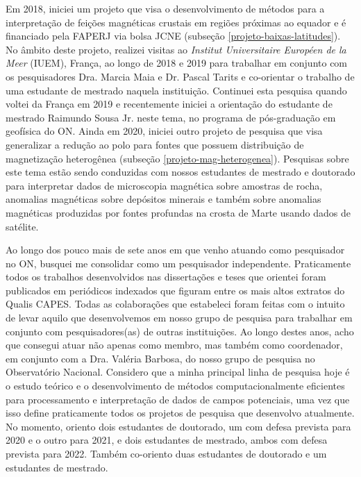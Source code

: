 Em 2018, iniciei um projeto que visa o desenvolvimento de métodos para a interpretação 
de feições magnéticas crustais em regiões próximas ao equador e é financiado pela 
FAPERJ via bolsa JCNE (subseção \ref{projeto-baixas-latitudes}). 
No âmbito deste projeto, realizei visitas ao \textit{Institut Universitaire Européen 
de la Meer} (IUEM), França, ao longo de 2018 e 2019 para trabalhar em conjunto com 
os pesquisadores Dra. Marcia Maia e Dr. Pascal Tarits e co-orientar o trabalho de 
uma estudante de mestrado naquela instituição. 
Continuei esta pesquisa quando voltei da França em 2019 e recentemente iniciei 
a orientação do estudante de mestrado Raimundo Sousa Jr. neste tema, no programa
de pós-graduação em geofísica do ON.
Ainda em 2020, iniciei outro projeto de pesquisa que visa generalizar a redução ao 
polo para fontes que possuem distribuição de magnetização heterogênea (subseção 
\ref{projeto-mag-heterogenea}). Pesquisas sobre este tema estão sendo conduzidas 
com nossos estudantes de mestrado e doutorado para interpretar dados de microscopia 
magnética sobre amostras de rocha, anomalias magnéticas sobre depósitos minerais e 
também sobre anomalias magnéticas produzidas por fontes profundas na crosta de Marte
usando dados de satélite.

Ao longo dos pouco mais de sete anos em que venho atuando como pesquisador no ON, 
busquei me consolidar como um pesquisador independente. 
Praticamente todos os trabalhos desenvolvidos nas dissertações e teses que 
orientei foram publicados em periódicos indexados que figuram entre 
os mais altos extratos do Qualis CAPES.
Todas as colaborações que estabeleci foram feitas com o intuito de levar aquilo que 
desenvolvemos em nosso grupo de pesquisa para trabalhar em conjunto com 
pesquisadores(as) de outras instituições. 
Ao longo destes anos, acho que consegui atuar não apenas como membro, mas também 
como coordenador, em conjunto com a Dra. Valéria Barbosa, do nosso grupo de pesquisa 
no Observatório Nacional.
Considero que a minha principal linha de pesquisa hoje é o estudo teórico e o
desenvolvimento de métodos computacionalmente eficientes para processamento e 
interpretação de dados de campos potenciais, uma vez que isso define praticamente 
todos os projetos de pesquisa que desenvolvo atualmente. No momento, oriento dois
estudantes de doutorado, um com defesa prevista para 2020 e o outro para 2021, 
e dois estudantes de mestrado, ambos com defesa prevista para 2022. Também 
co-oriento duas estudantes de doutorado e um estudantes de mestrado.


